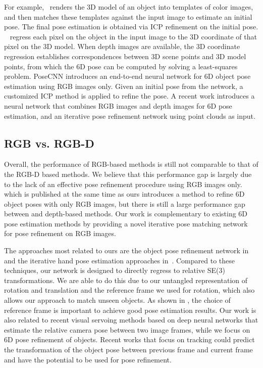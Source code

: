 \documentclass[twocolumn]{svjour3}
\begin{document}
For example,~\citep{hinterstoisser2012accv} renders the 3D model of an object into templates of color images, and then matches these templates against the input image to estimate an initial pose. The final pose estimation is obtained via ICP refinement on the initial pose. ~\citep{Brachmann2014Learning6O,brachmann2016uncertainty,michel2016global} regress each pixel on the object in the input image to the 3D coordinate of that pixel on the 3D model. When depth images are available, the 3D coordinate regression establishes correspondences between 3D scene points and 3D model points, from which the 6D pose can be computed by solving a least-squares problem. PoseCNN \citep{xiang2017posecnn} introduces an end-to-end neural network for 6D object pose estimation using RGB images only. Given an initial pose from the network, a customized ICP method is applied to refine the pose.  A recent work \citep{wang2019densefusion} introduces a neural network that combines RGB images and depth images for 6D pose estimation, and an iterative pose refinement network using point clouds as input.

\subsection{RGB vs. RGB-D}

Overall, the performance of RGB-based methods is still not comparable to that of the RGB-D based methods. We believe that this performance gap is largely due to the lack of an effective pose refinement procedure using RGB images only. \citep{manhardt2018deep} which is published at the same time as ours introduces a method to refine 6D object poses with only RGB images, but there is still a large performance gap between \citep{manhardt2018deep} and depth-based methods. Our work is complementary to existing 6D pose estimation methods by providing a novel iterative pose matching network for pose refinement on RGB images.


The approaches most related to ours are the object pose refinement network in~\citep{rad2017bb8} and the iterative hand pose estimation approaches in~\citep{carreiran2016hum,oberweger2015tra}. Compared to these techniques, our network is designed to directly regress to relative SE(3) transformations. We are able to do this due to our untangled representation of rotation and translation and the reference frame we used for rotation, which also allows our approach to match unseen objects. As shown in \citep{mousavian20173d}, the choice of reference frame is important to achieve good pose estimation results. Our work is also related to recent visual servoing methods based on deep neural networks \citep{saxena2017exploring,costante2018ls} that estimate the relative camera pose between two image frames, while we focus on 6D pose refinement of objects. Recent works \citep{garon2016real,garon2017deep} that focus on tracking could predict the transformation of the object pose between previous frame and current frame and have the potential to be used for pose refinement.
\end{document}

